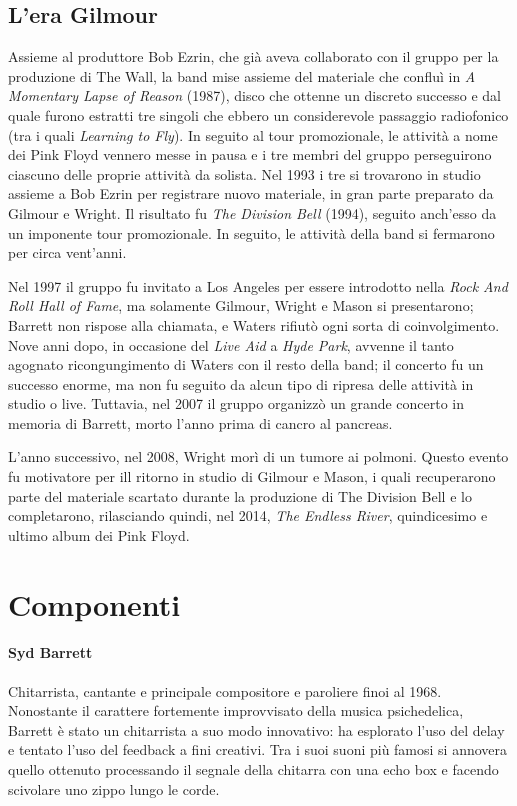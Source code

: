 \documentclass[class=book, crop=false, oneside, 12pt]{standalone}
\begin{document}
    \subsection{L'era Gilmour}
    Assieme al produttore Bob Ezrin, che già aveva collaborato con il gruppo per la produzione di The Wall, la band mise assieme del materiale che confluì in \emph{A Momentary Lapse of Reason} (1987), disco che ottenne un discreto successo e dal quale furono estratti tre singoli che ebbero un considerevole passaggio radiofonico (tra i quali \emph{Learning to Fly}). In seguito al tour promozionale, le attività a nome dei Pink Floyd vennero messe in pausa  e i tre membri del gruppo perseguirono ciascuno delle proprie attività da solista. Nel 1993 i tre si trovarono in studio assieme a Bob Ezrin per registrare nuovo materiale, in gran parte preparato da Gilmour e Wright. Il risultato fu \emph{The Division Bell} (1994), seguito anch'esso da un imponente tour promozionale. In seguito, le attività della band si fermarono per circa vent'anni.

    Nel 1997 il gruppo fu invitato a Los Angeles per essere introdotto nella \emph{Rock And Roll Hall of Fame}, ma solamente Gilmour, Wright e Mason si presentarono; Barrett non rispose alla chiamata, e Waters rifiutò ogni sorta di coinvolgimento. Nove anni dopo, in occasione del \emph{Live Aid} a \emph{Hyde Park}, avvenne il tanto agognato ricongungimento di Waters con il resto della band; il concerto fu un successo enorme, ma non fu seguito da alcun tipo di ripresa delle attività in studio o live. Tuttavia, nel 2007 il gruppo organizzò un grande concerto in memoria di Barrett, morto l'anno prima di cancro al pancreas.

    L'anno successivo, nel 2008, Wright morì di un tumore ai polmoni. Questo evento fu motivatore per ill ritorno in studio di Gilmour e Mason, i quali recuperarono parte del materiale scartato durante la produzione di The Division Bell e lo completarono, rilasciando quindi, nel 2014, \emph{The Endless River}, quindicesimo e ultimo album dei Pink Floyd.

    \section{Componenti}
    \paragraph{Syd Barrett}
    Chitarrista, cantante e principale compositore e paroliere finoi al 1968. Nonostante il carattere fortemente improvvisato della musica psichedelica, Barrett è stato un chitarrista a suo modo innovativo: ha esplorato l'uso del delay e tentato l'uso del feedback a fini creativi. Tra i suoi suoni più famosi si annovera quello ottenuto processando il segnale della chitarra con una echo box e facendo scivolare uno zippo lungo le corde. 
\end{document}
